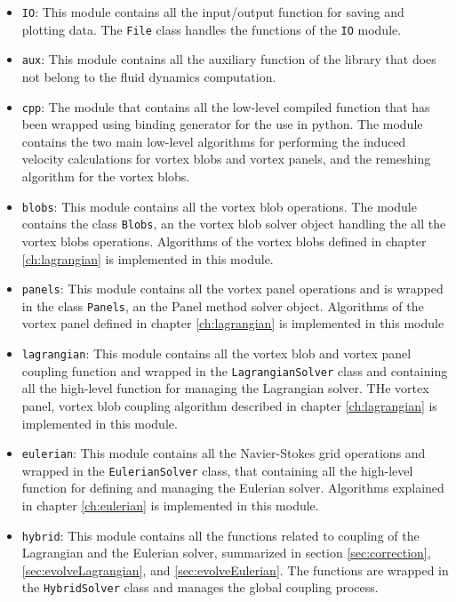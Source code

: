 \begin{itemize}
\item \texttt{IO}: This module contains all the input/output function for saving and plotting data. The \texttt{File} class handles the functions of the \texttt{IO} module.
\item \texttt{aux}: This module contains all the auxiliary function of the library that does not belong to the fluid dynamics computation.
\item \texttt{cpp}: The module that contains all the low-level compiled function that has been wrapped using binding generator for the use in python. The module contains the two main low-level algorithms for performing the induced velocity calculations for vortex blobs and vortex panels, and the remeshing algorithm for the vortex blobs.
\item \texttt{blobs}: This module contains all the vortex blob operations. The module contains the class \texttt{Blobs}, an the vortex blob solver object handling the all the vortex blobs operations. Algorithms of the vortex blobs defined in chapter \ref{ch:lagrangian} is implemented in this module.
\item \texttt{panels}: This module contains all the vortex panel operations and is wrapped in the class \texttt{Panels}, an the Panel method solver object. Algorithms of the vortex panel defined in chapter \ref{ch:lagrangian} is implemented in this module
\item \texttt{lagrangian}: This module contains all the vortex blob and vortex panel coupling function and wrapped in the \texttt{LagrangianSolver} class and containing all the high-level function for managing the Lagrangian solver. THe vortex panel, vortex blob coupling algorithm described in chapter \ref{ch:lagrangian} is implemented in this module.
\item \texttt{eulerian}: This module contains all the Navier-Stokes grid operations and wrapped in the \texttt{EulerianSolver} class, that containing all the high-level function for defining and managing the Eulerian solver. Algorithms explained in chapter \ref{ch:eulerian} is implemented in this module.
\item \texttt{hybrid}: This module contains all the functions related to coupling of the Lagrangian and the Eulerian solver, summarized in section \ref{sec:correction}, \ref{sec:evolveLagrangian}, and \ref{sec:evolveEulerian}. The functions are wrapped in the \texttt{HybridSolver} class and manages the global coupling process.

\end{itemize}

